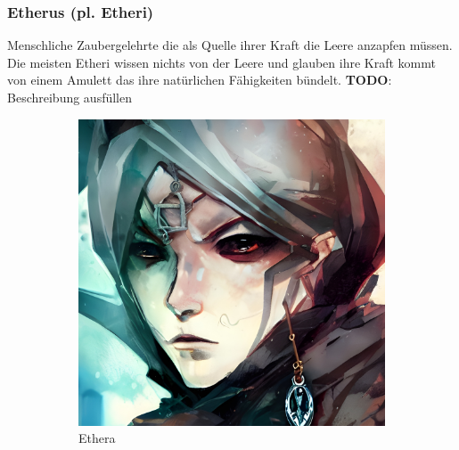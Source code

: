 \documentclass[11pt, twoside]{article}
\begin{document}
\subsubsection{Etherus (pl. Etheri)\label{etheri}}
\label{sec:org8374e46}
Menschliche Zaubergelehrte die als Quelle ihrer Kraft die Leere anzapfen müssen. Die meisten Etheri wissen nichts von der Leere und glauben ihre Kraft kommt von einem Amulett das ihre natürlichen Fähigkeiten bündelt.
\textbf{TODO}: Beschreibung ausfüllen
\begin{figure}[H]
\centering
\caption{Etheri}
\label{fig:etheri}
  \begin{subfigure}{0.3\textwidth}
    \centering
    \includegraphics[width=0.99\linewidth]{etheri1.jpeg}
    \caption{Ethera}
  \end{subfigure}%
  \begin{subfigure}{0.3\textwidth}
    \centering

\end{subfigure}
\end{figure}
\end{document}
